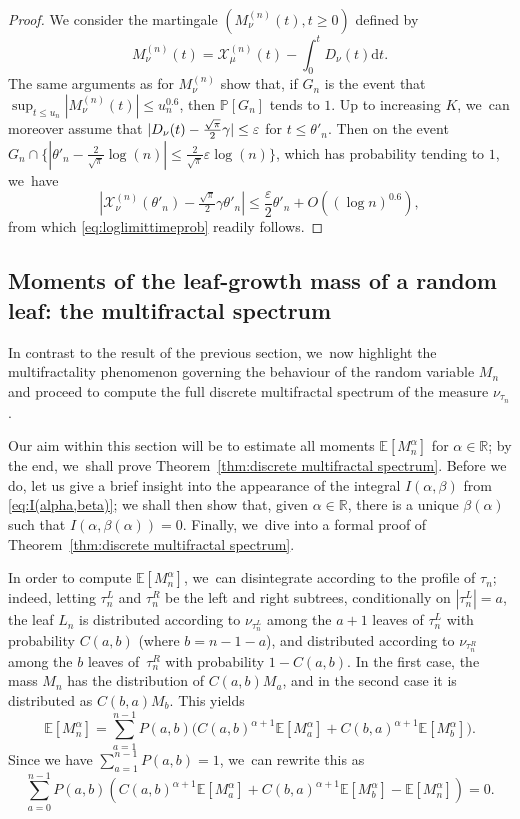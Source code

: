 \documentclass[JEP,XML,SOM,Unicode,NoFloatCountersInSection, NoEqCountersInSection,published]{cedram}
\newcommand{\Xmun}{\mathcal{X}^{(n)}_{\mu}}
\newcommand{\Xnun}{\mathcal{X}^{(n)}_{\nu}}
\newcommand{\E}{\mathbb{E}}
\newcommand{\R}{{\mathbb{R}}}
\newcommand{\pr}{\mathbb{P}}
\let\veps\varepsilon
\theoremstyle{definition}
\begin{document}
\begin{proof}
We consider the martingale $(M^{(n)}_{\nu}(t),t\geq 0)$ defined by
\[
M^{(n)}_{\nu}(t)=\Xmun(t)-\int_0^t D_{\nu}(t)\mathrm dt.
\]
The same arguments as for $M^{(n)}_{\nu}$ show that, if $G_n$ is the event that $\sup_{t\leq u_n} |M^{(n)}_{\nu}(t)| \leq u_n^{0.6}$, then $\pr[G_n]$ tends to $1$. Up to increasing $K$, we~can moreover assume that $|D_{\nu}(t)-\nobreak\frac{\sqrt{\pi}}{2}\gamma|\leq \veps$ for $t\leq \theta'_n$. Then on the event $G_n\cap\{|\theta'_n-\frac{2}{\sqrt{\pi}}\log(n)|\leq \frac{2}{\sqrt{\pi}}\veps\log(n)\}$, which has probability tending to $1$, we~have
\[
|\Xnun(\theta'_n)-\tfrac{\sqrt{\pi}}{2}\gamma\theta'_n|\leq \frac{\veps}{2}\theta'_n+O((\log n)^{0.6}),
\]
from which \eqref{eq:loglimittimeprob} readily follows.
\end{proof}

\subsection{Moments of the leaf-growth mass of a random leaf: the multifractal spectrum}\label{section:multifractal spectrum}
In contrast to the result of the previous section, we~now highlight the multifractality phenomenon governing the behaviour of the random variable $M_n$ and proceed to compute the full discrete multifractal spectrum of the measure $\nu_{\tau_n}$.

Our aim within this section will be to estimate all moments $\E[M_n^\alpha]$ for $\alpha\in\R$; by the end, we~shall prove Theorem~\ref{thm:discrete multifractal spectrum}. Before we do, let us give a brief insight into the appearance of the integral $I(\alpha,\beta)$ from \eqref{eq:I(alpha,beta)}; we shall then show that, given $\alpha\in\R$, there is a unique $\beta(\alpha)$ such that $I(\alpha,\beta(\alpha))=0$. Finally, we~dive into a formal proof of Theorem~\ref{thm:discrete multifractal spectrum}.

In order to compute $\E[M_n^\alpha]$, we~can disintegrate according to the profile of $\tau_n$; indeed, letting $\tau_n^L$ and $\tau_n^R$ be the left and right subtrees, conditionally on $|\tau_n^L|=a$, the leaf $L_n$ is distributed according to $\nu_{\tau_n^L}$ among the $a+1$ leaves of $\tau_n^L$ with probability $C(a,b)$ (where $b=n-1-a$), and distributed according to $\nu_{\tau_n^R}$ among the $b$ leaves of~$\tau_n^R$ with probability $1-C(a,b)$. In the first case, the mass $M_n$ has the distribution of $C(a,b)M_a$, and in the second case it is distributed as $C(b,a)M_{b}$. This yields
\[
\E[M_n^\alpha]=\sum_{a=1}^{n-1}P(a,b)\bigl(C(a,b)^{\alpha+1}\E[M_a^\alpha]+C(b,a)^{\alpha+1}\E[M_b^\alpha]\bigr).
\]
Since we have $\sum_{a=1}^{n-1}P(a,b)=1$, we~can rewrite this as
\[
\sum_{a=0}^{n-1}P(a,b)\left(C(a,b)^{\alpha+1} \E[M_a^\alpha]+C(b,a)^{\alpha+1} \E[M_b^\alpha]-\E[M_n^\alpha]\right)=0.
\]
\end{document}
